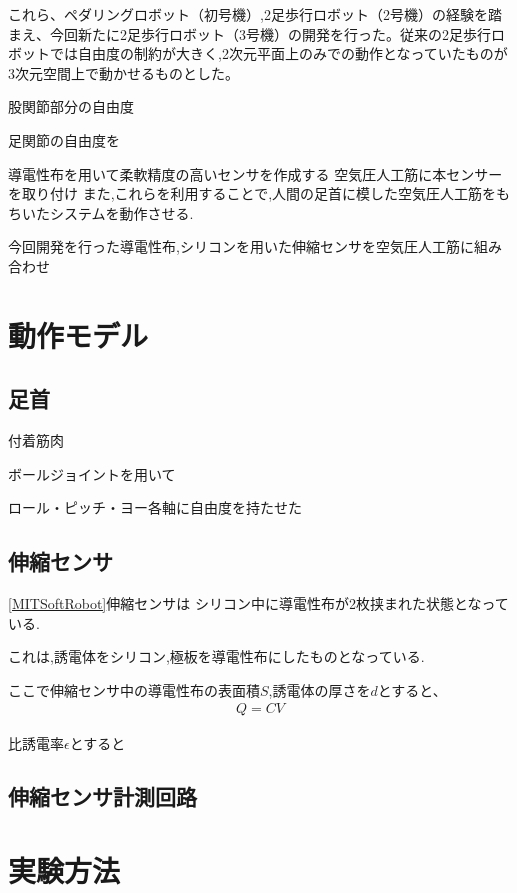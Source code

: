 これら、ペダリングロボット（初号機）,2足歩行ロボット（2号機）の経験を踏まえ、今回新たに2足歩行ロボット（3号機）の開発を行った。従来の2足歩行ロボットでは自由度の制約が大きく,2次元平面上のみでの動作となっていたものが3次元空間上で動かせるものとした。

股関節部分の自由度

足関節の自由度を

導電性布を用いて柔軟精度の高いセンサを作成する
空気圧人工筋に本センサーを取り付け
また,これらを利用することで,人間の足首に模した空気圧人工筋をもちいたシステムを動作させる.

今回開発を行った導電性布,シリコンを用いた伸縮センサを空気圧人工筋に組み合わせ
\section{動作モデル}
\subsection{足首}
付着筋肉

ボールジョイントを用いて

ロール・ピッチ・ヨー各軸に自由度を持たせた
\subsection{伸縮センサ}
\ref{MITSoftRobot}伸縮センサは
シリコン中に導電性布が2枚挟まれた状態となっている.

これは,誘電体をシリコン,極板を導電性布にしたものとなっている.

ここで伸縮センサ中の導電性布の表面積$S$,誘電体の厚さを$d$とすると、
\begin{eqnarray}
    Q=CV
\end{eqnarray}

比誘電率$\epsilon$とすると

\subsection{伸縮センサ計測回路}
\section{実験方法}
